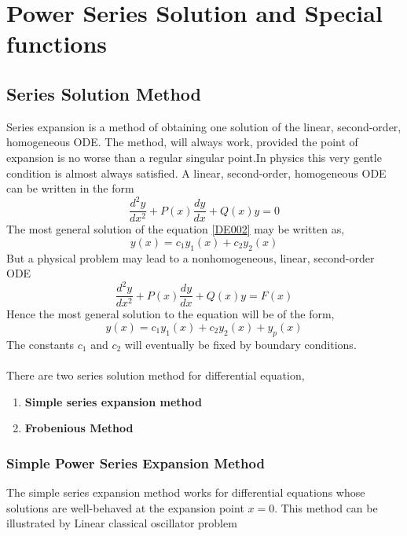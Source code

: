 \chapter{Power Series Solution and Special functions}
\section{Series Solution Method}
Series expansion is a  method of obtaining one solution of the linear, second-order, homogeneous ODE. The method, will always work, provided the point of expansion is no worse than a regular singular point.In physics this very gentle condition is almost always satisfied. 
A linear, second-order, homogeneous ODE can be written in the form
\begin{equation}
\frac{d^{2} y}{d x^{2}}+P(x) \frac{d y}{d x}+Q(x) y=0 \label{DE002}
\end{equation}
The most general solution of the equation \ref{DE002} may be written as,
\begin{equation}
y(x)=c_{1} y_{1}(x)+c_{2} y_{2}(x)
\end{equation}
But a physical problem may lead to a nonhomogeneous, linear, second-order ODE
\begin{equation}
\frac{d^{2} y}{d x^{2}}+P(x) \frac{d y}{d x}+Q(x) y=F(x)\label{DE003}
\end{equation}
Hence the most general solution to the equation \label{DE003} will be of the form,
\begin{equation}
y(x)=c_{1} y_{1}(x)+c_{2} y_{2}(x)+y_{p}(x)
\end{equation}
The constants $c_{1}$ and $c_{2}$ will eventually be fixed by boundary conditions.\\\\
There are two series solution method  for differential equation,
\begin{enumerate}
	\item \textbf{Simple series expansion method}
	\item \textbf{Frobenious Method}
\end{enumerate}
\subsection{Simple Power Series Expansion Method}
The simple series expansion method works for differential equations whose solutions are well-behaved at the expansion point $x = 0$.
This method can be illustrated by Linear classical oscillator problem
